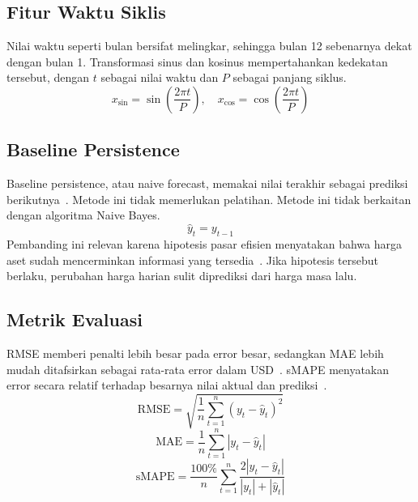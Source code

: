 \documentclass[conference,a4paper]{IEEEtran}
\begin{document}
\subsection{Fitur Waktu Siklis}
Nilai waktu seperti bulan bersifat melingkar, sehingga bulan 12 sebenarnya dekat dengan bulan 1. Transformasi sinus dan kosinus mempertahankan kedekatan tersebut, dengan $t$ sebagai nilai waktu dan $P$ sebagai panjang siklus.
\begin{equation}
x_{\sin} = \sin\left(\frac{2\pi t}{P}\right), \quad x_{\cos} = \cos\left(\frac{2\pi t}{P}\right)
\label{eq:siklis}
\end{equation}

\subsection{Baseline Persistence}
Baseline persistence, atau naive forecast, memakai nilai terakhir sebagai prediksi berikutnya~\cite{hyndman2021}. Metode ini tidak memerlukan pelatihan. Metode ini tidak berkaitan dengan algoritma Naive Bayes.
\begin{equation}
\hat{y}_t = y_{t-1}
\label{eq:baseline}
\end{equation}
Pembanding ini relevan karena hipotesis pasar efisien menyatakan bahwa harga aset sudah mencerminkan informasi yang tersedia~\cite{fama1970}. Jika hipotesis tersebut berlaku, perubahan harga harian sulit diprediksi dari harga masa lalu.

\subsection{Metrik Evaluasi}
RMSE memberi penalti lebih besar pada error besar, sedangkan MAE lebih mudah ditafsirkan sebagai rata-rata error dalam USD~\cite{hodson2022}. sMAPE menyatakan error secara relatif terhadap besarnya nilai aktual dan prediksi~\cite{hyndman2006}.
\begin{equation}
\mathrm{RMSE} = \sqrt{\frac{1}{n}\sum_{t=1}^{n}\left(y_t - \hat{y}_t\right)^2}
\label{eq:rmse}
\end{equation}
\begin{equation}
\mathrm{MAE} = \frac{1}{n}\sum_{t=1}^{n}\left|y_t - \hat{y}_t\right|
\label{eq:mae}
\end{equation}
\begin{equation}
\mathrm{sMAPE} = \frac{100\%}{n}\sum_{t=1}^{n}\frac{2\left|y_t - \hat{y}_t\right|}{\left|y_t\right| + \left|\hat{y}_t\right|}
\label{eq:smape}
\end{equation}
\end{document}
